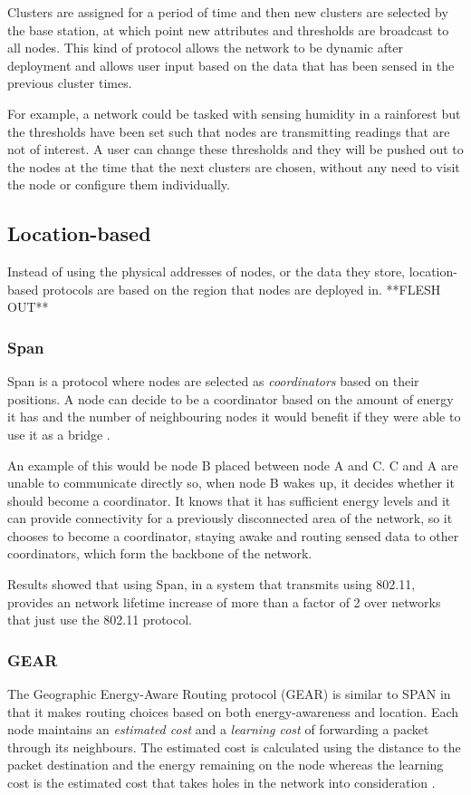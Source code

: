 Clusters are assigned for a period of time and then new clusters are selected by the base station, at which point new attributes and thresholds are broadcast to all nodes. This kind of protocol allows the network to be dynamic after deployment and allows user input based on the data that has been sensed in the previous cluster times. 

For example, a network could be tasked with sensing humidity in a rainforest but the thresholds have been set such that nodes are transmitting readings that are not of interest. A user can change these thresholds and they will be pushed out to the nodes at the time that the next clusters are chosen, without any need to visit the node or configure them individually.

\subsection{Location-based}
	Instead of using the physical addresses of nodes, or the data they store, location-based protocols are based on the region that nodes are deployed in. **FLESH OUT**

\subsubsection{Span}
	Span is a protocol where nodes are selected as \textit{coordinators} based on their positions. A node can decide to be a coordinator based on the amount of energy it has and the number of neighbouring nodes it would benefit if they were able to use it as a bridge \cite{Chen2002}.

An example of this would be node B placed between node A and C. C and A are unable to communicate directly so, when node B wakes up, it decides whether it should become a coordinator. It knows that it has sufficient energy levels and it can provide connectivity for a previously disconnected area of the network, so it chooses to become a coordinator, staying awake and routing sensed data to other coordinators, which form the backbone of the network.

Results showed that using Span, in a system that transmits using 802.11, provides an network lifetime increase of more than a factor of 2 over networks that just use the 802.11 protocol.

\subsubsection{GEAR}
The Geographic Energy-Aware Routing protocol (GEAR) is similar to SPAN in that it makes routing choices based on both energy-awareness and location. Each node maintains an \textit{estimated cost} and a \textit{learning cost} of forwarding a packet through its neighbours. The estimated cost is calculated using the distance to the packet destination and the energy remaining on the node whereas the learning cost is the estimated cost that takes holes in the network into consideration \cite{Yu2001}. 

